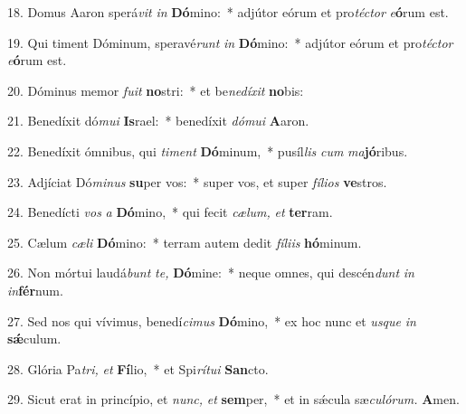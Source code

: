 \item 18. Domus Aaron sperá\textit{vit} \textit{in} \textbf{Dó}mino:~* adjútor eórum et pro\textit{téctor} \textit{e}\textbf{ó}rum est.
\item 19. Qui timent Dóminum, speravé\textit{runt} \textit{in} \textbf{Dó}mino:~* adjútor eórum et pro\textit{téctor} \textit{e}\textbf{ó}rum est.
\item 20. Dóminus memor \textit{fuit} \textbf{no}stri:~* et be\textit{nedíxit} \textbf{no}bis:
\item 21. Benedíxit dó\textit{mui} \textbf{Is}rael:~* benedíxit \textit{dómui} \textbf{A}aron.
\item 22. Benedíxit ómnibus, qui \textit{timent} \textbf{Dó}minum,~* pusíl\textit{lis} \textit{cum} \textit{ma}\textbf{jó}ribus.
\item 23. Adjíciat Dó\textit{minus} \textbf{su}per vos:~* super vos, et super \textit{fílios} \textbf{ve}stros.
\item 24. Benedícti \textit{vos} \textit{a} \textbf{Dó}mino,~* qui fecit \textit{cælum,} \textit{et} \textbf{ter}ram.
\item 25. Cælum \textit{cæli} \textbf{Dó}mino:~* terram autem dedit \textit{fíliis} \textbf{hó}minum.
\item 26. Non mórtui laudá\textit{bunt} \textit{te,} \textbf{Dó}mine:~* neque omnes, qui descén\textit{dunt} \textit{in} \textit{in}\textbf{fér}num.
\item 27. Sed nos qui vívimus, benedí\textit{cimus} \textbf{Dó}mino,~* ex hoc nunc et \textit{usque} \textit{in} \textbf{sǽ}culum.
\item 28. Glória Pa\hspace{0.03em}\textit{tri,} \textit{et} \textbf{Fí}lio,~* et Spi\textit{rítui} \textbf{San}cto.
\item 29. Sicut erat in princípio, et \textit{nunc,} \textit{et} \textbf{sem}per,~* et in sǽcula sæ\textit{culórum.} \textbf{A}men.
